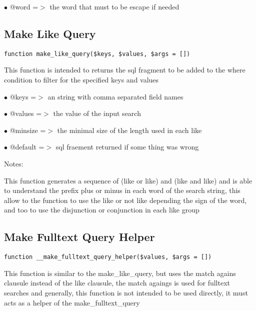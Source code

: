 \documentclass[a4paper]{book}
\begin{document}
\begin{compactitem}
\item[\color{myblue}$\bullet$] @word =$>$ the word that must to be escape if needed
\end{compactitem}

\hypertarget{toc262}{}
\subsection{Make Like Query}

\begin{lstlisting}
function make_like_query($keys, $values, $args = [])
\end{lstlisting}

This function is intended to returns the sql fragment to be added to the
where condition to filter for the specified keys and values

\begin{compactitem}
\item[\color{myblue}$\bullet$] @keys    =$>$ an string with comma separated field names
\item[\color{myblue}$\bullet$] @values  =$>$ the value of the input search
\item[\color{myblue}$\bullet$] @minsize =$>$ the minimal size of the length used in each like
\item[\color{myblue}$\bullet$] @default =$>$ sql fraement returned if some thing was wrong
\end{compactitem}

Notes:

This function generates a sequence of (like or like) and (like and like)
and is able to understand the prefix plus or minus in each word of the
search string, this allow to the function to use the like or not like
depending the sign of the word, and too to use the disjunction or
conjunction in each like group

\hypertarget{toc263}{}
\subsection{Make Fulltext Query Helper}

\begin{lstlisting}
function __make_fulltext_query_helper($values, $args = [])
\end{lstlisting}

This function is similar to the make\_like\_query, but uses the match agains
clausule instead of the like clausule, the match agaings is used for
fulltext searches and generally, this function is not intended to be used
directly, it must acts as a helper of the make\_fulltext\_query
\end{document}
